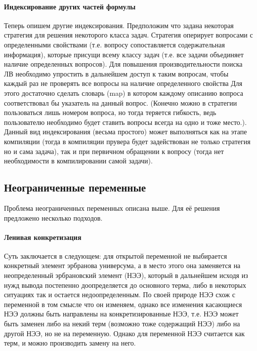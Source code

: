 \paragraph{Индексирование других частей формулы}
Теперь опишем другие  индексирования. Предположим что  задана некоторая стратегия для решения некоторого класса задач. Стратегия оперирует вопросами с определенными свойствами (т.е. вопросу сопоставляется содержательная информация), которые присущи всему классу задач (т.е. все задачи объединяет наличие определенных вопросов). Для повышения производительности поиска ЛВ необходимо упростить в дальнейшем доступ к таким вопросам, чтобы каждый раз не проверять все вопросы на наличие определенного свойства Для этого достаточно сделать словарь (map) в котором каждому описанию вопроса соответствовал бы указатель на данный вопрос. (Конечно можно в стратегии пользоваться лишь номером вопроса, но тогда теряется гибкость, ведь пользователю необходимо будет ставить вопросы всегда на одно и тоже место.). Данный вид индексирования (весьма простого) может выполняться как на этапе компиляции (тогда в компиляции прувера будет задействован не только стратегия но и сама задача), так и при первичном обращении к вопросу (тогда нет необходимости в компилировании самой задачи).

\subsection{Неограниченные переменные}
Проблема неограниченных переменных описана выше. Для её решения предложено несколько подходов.

\paragraph{Ленивая конкретизация}
Суть заключается в следующем: для открытой переменной не выбирается конкретный элемент эрбранова универсума, а в место этого она заменяется на неопределенный эрбрановский элемент (НЭЭ), который в дальнейшем исходя из нужд вывода постепенно доопределяется до основного терма, либо в некоторых ситуациях так и остается недоопределенным.
По своей природе НЭЭ схож с переменной в том смысле что он изменяем, однако все изменения касающиеся НЭЭ должны быть направлены на конкретизированные НЭЭ, т.е. НЭЭ может быть заменен либо на некий терм (возможно тоже содержащий НЭЭ) либо на другой НЭЭ, но не на переменную. Однако для переменной НЭЭ считается как терм, и можно производить замену на него.

